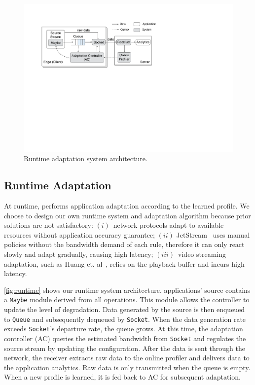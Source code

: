 \begin{figure}
  \centering
  \includegraphics[width=\linewidth]{figures/runtime-adaptation.pdf}
  \caption{Runtime adaptation system architecture.}
  \label{fig:runtime}
\end{figure}

\subsection{Runtime Adaptation}
\label{sec:runtime}

At runtime, \sysname{} performs application adaptation according to the learned
profile. We choose to design our own runtime system and adaptation algorithm
because prior solutions are not satisfactory: $(i)$~network protocols adapt to
available resources without application accuracy guarantee; $(ii)$
JetStream~\cite{rabkin2014aggregation} uses manual policies without the
bandwidth demand of each rule, therefore it can only react slowly and adapt
gradually, causing high latency; $(iii)$~video streaming adaptation, such as
Huang et. al~\cite{huang2014buffer}, relies on the playback buffer and incurs
high latency.

\autoref{fig:runtime} shows our runtime system architecture. \sysname{}
applications' source contains a \texttt{Maybe} module derived from all \maybe{}
operations. This module allows the controller to update the level of
degradation. Data generated by the source is then enqueued to \texttt{Queue} and
subsequently dequeued by \texttt{Socket}. When the data generation rate exceeds
\texttt{Socket}'s departure rate, the queue grows. At this time, the adaptation
controller (AC) queries the estimated bandwidth from \texttt{Socket} and
regulates the source stream by updating the configuration.  After the data is
sent through the network, the receiver extracts raw data to the online profiler
and delivers data to the application analytics. Raw data is only transmitted
when the queue is empty. When a new profile is learned, it is fed back to AC for
subsequent adaptation.

